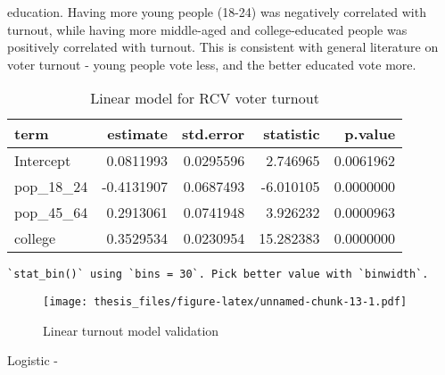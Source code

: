 \documentclass[12pt,twoside]{reedthesis}
\theoremstyle{definition}
\theoremstyle{definition}
\theoremstyle{definition}
\theoremstyle{remark}
\begin{document}
education. Having more young people (18-24) was negatively correlated
with turnout, while having more middle-aged and college-educated people
was positively correlated with turnout. This is consistent with general
literature on voter turnout - young people vote less, and the better
educated vote more.
\begin{longtable}[t]{lrrrr}
\caption[Linear turnout model]{\label{tab:unnamed-chunk-13}Linear model for RCV voter turnout}\\
\toprule
term & estimate & std.error & statistic & p.value\\
\midrule
Intercept & 0.0811993 & 0.0295596 & 2.746965 & 0.0061962\\
pop\_18\_24 & -0.4131907 & 0.0687493 & -6.010105 & 0.0000000\\
pop\_45\_64 & 0.2913061 & 0.0741948 & 3.926232 & 0.0000963\\
college & 0.3529534 & 0.0230954 & 15.282383 & 0.0000000\\
\bottomrule
\end{longtable}
\begin{verbatim}
`stat_bin()` using `bins = 30`. Pick better value with `binwidth`.
\end{verbatim}
\begin{figure}
\centering
\texttt{[image: thesis\_files/figure-latex/unnamed-chunk-13-1.pdf]}
\caption{\label{fig:unnamed-chunk-13}Linear turnout model validation}
\end{figure}
Logistic -
\end{document}

